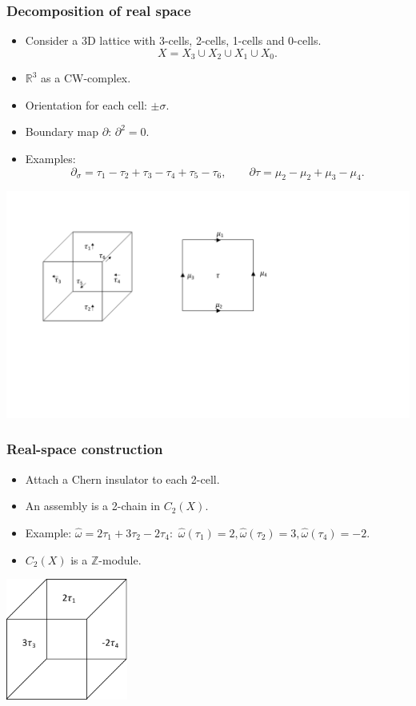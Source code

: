 \documentclass[xcolor=table, 10pt, aspectratio=43]{beamer}
\begin{document}
\begin{frame}
\frametitle{Decomposition of real space}
\begin{itemize}
\item Consider a 3D lattice with 3-cells, 2-cells, 1-cells and 0-cells.
\[X = X_3\cup X_2\cup X_1\cup X_0.\]
\item $\mathbb R^3$ as a CW-complex.
\item Orientation for each cell: $\pm\sigma$.
\item Boundary map $\partial$: $\partial^2=0$.
\item Examples:
\[\partial_\sigma = \tau_1-\tau_2+\tau_3-\tau_4+\tau_5-\tau_6,\quad\quad
\partial\tau = \mu_2-\mu_2+\mu_3-\mu_4.\]
\end{itemize}
\begin{center}
	\includegraphics[width=.8\textwidth]{cells}
\end{center}
\end{frame}

\begin{frame}
\frametitle{Real-space construction}
\begin{itemize}
\item Attach a Chern insulator to each 2-cell.
\item An assembly is a 2-chain in $C_2(X)$.
\item Example: $\hat\omega = 2\tau_1 + 3\tau_2-2\tau_4:$
$\hat\omega(\tau_1)=2,\hat\omega(\tau_2)=3,\hat\omega(\tau_4)=-2$.
\item $C_2(X)$ is a $\mathbb Z$-module.
\end{itemize}
\begin{center}
	\includegraphics[width=4cm]{decor}
\end{center}
\end{frame}
\end{document}
